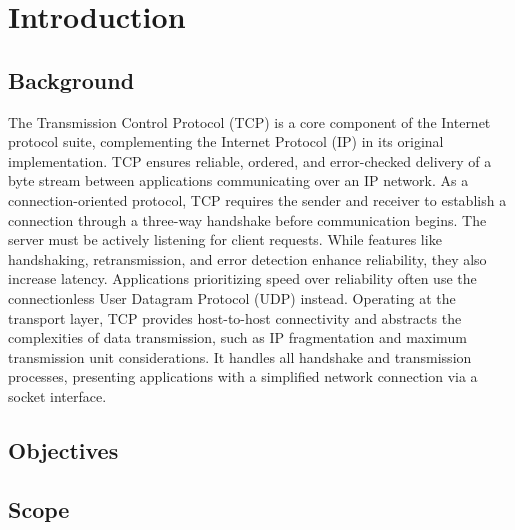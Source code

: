 \section{Introduction}

\subsection{Background}

The Transmission Control Protocol (TCP) is a core component of the Internet protocol suite, complementing the Internet Protocol (IP) in its original implementation. TCP ensures reliable, ordered, and error-checked delivery of a byte stream between applications communicating over an IP network. As a connection-oriented protocol, TCP requires the sender and receiver to establish a connection through a three-way handshake before communication begins. The server must be actively listening for client requests. While features like handshaking, retransmission, and error detection enhance reliability, they also increase latency. Applications prioritizing speed over reliability often use the connectionless User Datagram Protocol (UDP) instead. Operating at the transport layer, TCP provides host-to-host connectivity and abstracts the complexities of data transmission, such as IP fragmentation and maximum transmission unit considerations. It handles all handshake and transmission processes, presenting applications with a simplified network connection via a socket interface.

\subsection{Objectives}

\subsection{Scope}